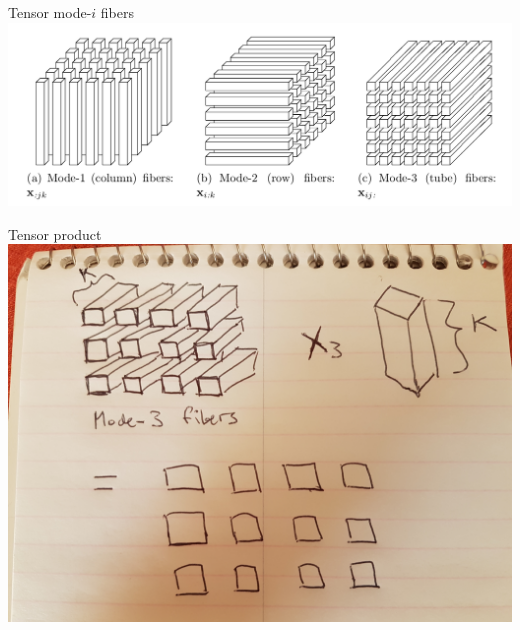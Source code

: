 \documentclass{beamer}
\begin{document}
{%
\begin{frame}{Tensor mode-$i$ fibers}
        \center{}
        \includegraphics[scale=0.275]{data/tensor_fibers}
\end{frame}
}

{%
%
\begin{frame}{Tensor product}
        \center{}
        \includegraphics[scale=0.075]{data/tensor_product}
\end{frame}
}
\end{document}
